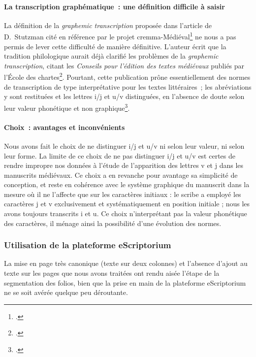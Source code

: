 \documentclass{article}
\begin{document}
	\paragraph{La transcription graphématique~: une définition difficile à saisir}
	La définition de la \textit{graphemic transcription} proposée dans l'article de D.~Stutzman cité en référence par le projet \gls{cremma}-Médiéval\footcite[p.~251]{stutzmannPaleographieStatistiquePour2011} ne nous a pas permis de lever cette difficulté de manière définitive. L'auteur écrit que la tradition philologique aurait déjà clarifié les problèmes de la \textit{graphemic transcription}, citant les \textit{Conseils pour l'édition des textes médiévaux} publiés par l'École des chartes\footcite{ecolenationaledeschartesConseilsPourEdition2001a}. Pourtant, cette publication prône essentiellement des normes de transcription de type interprétative pour les textes littéraires~; les abréviations y sont restituées et les lettres i/j et u/v distinguées, en l'absence de doute selon leur valeur phonétique et non graphique\footcite[fasc. 1, p.~23 et suivantes, ainsi que 31 pour les abréviations]{ecolenationaledeschartesConseilsPourEdition2001a}.
	
	\paragraph{Choix~: avantages et inconvénients}
	Nous avons fait le choix de ne distinguer i/j et u/v ni selon leur valeur, ni selon leur forme. La limite de ce choix de ne pas distinguer i/j et u/v est certes de rendre impropre nos données à l'étude de l'apparition des lettres v et j dans les manuscrits médiévaux. Ce choix a en revanche pour avantage sa simplicité de conception, et reste en cohérence avec le système graphique du manuscrit dans la mesure où il ne l'affecte que sur les caractères initiaux : le scribe a employé les caractères j et v exclusivement et systématiquement en position initiale ; nous les avons toujours transcrits i et u. Ce choix n'interprétant pas la valeur phonétique des caractères, il ménage ainsi la possibilité d'une évolution des normes.
	
	\subsubsection{Utilisation de la plateforme eScriptorium}
	La mise en page très canonique (texte sur deux colonnes) et l'absence d'ajout au texte sur les pages que nous avons traitées ont rendu aisée l'étape de la segmentation des folios, bien que la prise en main de la plateforme eScriptorium ne se soit avérée quelque peu déroutante.
	
\end{document}
